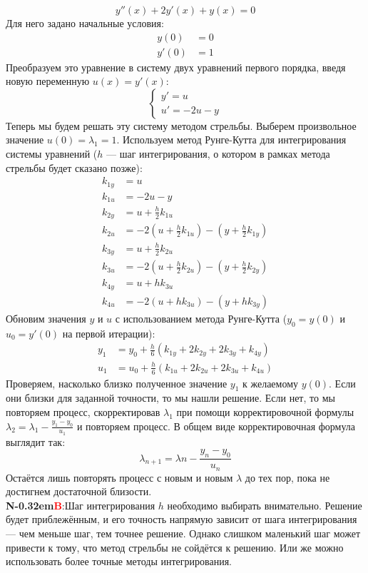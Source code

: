 \documentclass[a4paper]{article}
\newcommand\NB{\textbf{N\kern-0.32em\textcolor{red}{B}}:\quad}
\begin{document}
$$y''(x)+2y'(x)+y(x) = 0$$
Для него задано начальные условия:
$$\begin{aligned}
    y(0) &= 0 \\ y'(0) &= 1
\end{aligned}$$
Преобразуем это уравнение в систему двух уравнений первого порядка, введя новую переменную $u(x) = y'(x)$:
$$\begin{cases}
    y' = u \\ u' = -2u - y
\end{cases}$$
\clearpage\noindent Теперь мы будем решать эту систему методом стрельбы. Выберем произвольное значение $u(0) = \lambda_1 = 1$. Используем метод Рунге-Кутта для интегрирования системы уравнений ($h$ --- шаг интегрирования, о котором в рамках метода стрельбы будет сказано позже):
$$\begin{aligned}
    k_{1y} &= u \\
    k_{1u} &= -2u - y \\
    k_{2y} &= u + \frac{h}{2}k_{1u} \\
    k_{2u} &= -2\left( u + \frac{h}{2}k_{1u} \right) - \left( y + \frac{h}{2}k_{1y} \right) \\
    k_{3y} &= u + \frac{h}{2}k_{2u} \\
    k_{3u} &= -2\left( u + \frac{h}{2}k_{2u} \right) - \left( y + \frac{h}{2}k_{2y} \right) \\
    k_{4y} &= u + hk_{3u} \\
    k_{4u} &= -2\left( u + hk_{3u} \right) - \left( y + hk_{3y} \right)
\end{aligned}$$
Обновим значения $y$ и $u$ с использованием метода Рунге-Кутта ($y_0 = y(0)$ и $u_0 = y'(0)$ на первой итерации):
$$\begin{aligned}
    y_1 &= y_0 + \frac{h}{6}\left( k_{1y} + 2k_{2y} + 2k_{3y} + k_{4y} \right) \\
    u_1 &= u_0 + \frac{h}{6}\left( k_{1u} + 2k_{2u} + 2k_{3u} + k_{4u} \right)
\end{aligned}$$
Проверяем, насколько близко полученное значение $y_1$ к желаемому $y(0)$. Если они близки для заданной точности, то мы нашли решение. Если нет, то мы повторяем процесс, скорректировав $\lambda_1$  при помощи корректировочной формулы $\lambda_2 = \lambda_1 - \frac{y_1 - y_0}{u_1}$ и повторяем процесс. В общем виде корректировочная формула выглядит так:
$$\lambda_{n+1} = \lambda{n} - \frac{y_n - y_0}{u_n}$$
Остаётся лишь повторять процесс с новым и новым $\lambda$ до тех пор, пока не достигнем достаточной близости.\\[2mm]
\NB Шаг интегрирования $h$ необходимо выбирать внимательно. Решение будет приблежённым, и его точность напрямую зависит от шага интегрирования --- чем меньше шаг, тем точнее решение. Однако слишком маленький шаг может привести к тому, что метод стрельбы не сойдётся к решению. Или же можно использовать более точные методы интегрирования.
\end{document}
